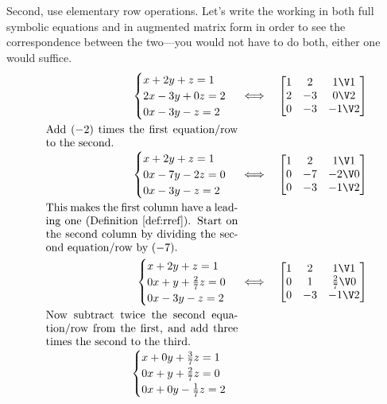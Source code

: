 \begin{example}
\begin{solution}
Second, use elementary row operations.
Let's write the working in both full symbolic equations and in augmented matrix form in order to see the correspondence between the two---you would not have to do both, either one would suffice.
\begin{eqnarray*}
\begin{cases}
x+2y+z=1\\ 2x-3y+0z=2\\ 0x-3y-z=2
\end{cases}
&\iff&%
\begin{bmatrix} 1&2&1\V1\\2&-3&0\V2\\0&-3&-1\V2 \end{bmatrix}
\\
\parbox{0.5\linewidth}{Add \((-2)\) times the first equation\slash row to the second.}
\\
\begin{cases}
x+2y+z=1\\ 0x-7y-2z=0\\ 0x-3y-z=2
\end{cases}
&\iff&%
\begin{bmatrix} 1&2&1\V1\\0&-7&-2\V0\\0&-3&-1\V2 \end{bmatrix}
\\
\parbox{0.5\linewidth}{This makes the first column have a leading one (Definition~\ref{def:rref}).  Start on the second column by dividing the second equation\slash row by~\((-7)\).}
\\
\begin{cases}
x+2y+z=1\\ 0x+y+\frac27z=0\\ 0x-3y-z=2
\end{cases}
&\iff&%
\begin{bmatrix} 1&2&1\V1\\0&1&\frac27\V0\\0&-3&-1\V2 \end{bmatrix}
\\
\parbox{0.5\linewidth}{Now subtract twice the second equation\slash row from the first, and add three times the second to the third.}
\\
\begin{cases}
x+0y+\frac37z=1\\ 0x+y+\frac27z=0\\ 0x+0y-\frac17z=2
\end{cases}

\end{eqnarray*}
\end{solution}
\end{example}
